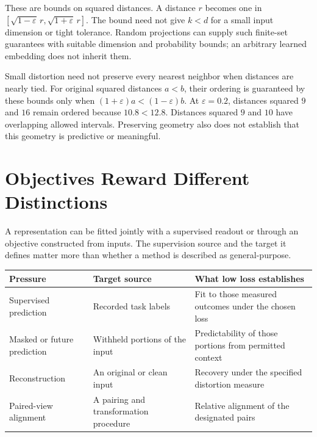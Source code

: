 These are bounds on squared distances. A distance $r$ becomes one in $[\sqrt{1-\varepsilon}\,r,\sqrt{1+\varepsilon}\,r]$. The bound need not give $k<d$ for a small input dimension or tight tolerance. Random projections can supply such finite-set guarantees with suitable dimension and probability bounds; an arbitrary learned embedding does not inherit them.

Small distortion need not preserve every nearest neighbor when distances are nearly tied. For original squared distances $a<b$, their ordering is guaranteed by these bounds only when $(1+\varepsilon)a<(1-\varepsilon)b$. At $\varepsilon=0.2$, distances squared $9$ and $16$ remain ordered because $10.8<12.8$. Distances squared $9$ and $10$ have overlapping allowed intervals. Preserving geometry also does not establish that this geometry is predictive or meaningful.

\section{Objectives Reward Different Distinctions}

A representation can be fitted jointly with a supervised readout or through an objective constructed from inputs. The supervision source and the target it defines matter more than whether a method is described as general-purpose.

\par\addvspace{\intextsep}\noindent\begin{minipage}{\linewidth}
\centering\small
\begin{tabular}{@{}L{2.45cm}L{3.5cm}L{4.15cm}@{}}
\toprule
Pressure & Target source & What low loss establishes \\
\midrule
Supervised prediction & Recorded task labels & Fit to those measured outcomes under the chosen loss \\
Masked or future prediction & Withheld portions of the input & Predictability of those portions from permitted context \\
Reconstruction & An original or clean input & Recovery under the specified distortion measure \\
Paired-view alignment & A pairing and transformation procedure & Relative alignment of the designated pairs \\
\bottomrule
\end{tabular}
\label{tab:supervised-selfsupervised-transfer}
\end{minipage}\par\addvspace{\intextsep}

